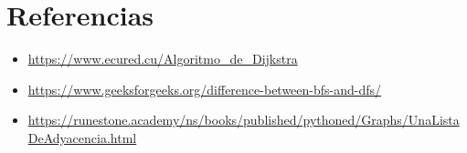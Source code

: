 \documentclass{article}
\begin{document}
        \section{Referencias}
        
        \begin{itemize}			
            \item \url{https://www.ecured.cu/Algoritmo_de_Dijkstra}
            \item \url{https://www.geeksforgeeks.org/difference-between-bfs-and-dfs/}
            \item \url{https://runestone.academy/ns/books/published/pythoned/Graphs/UnaListaDeAdyacencia.html}     
        \end{itemize}	

    
\end{document}
